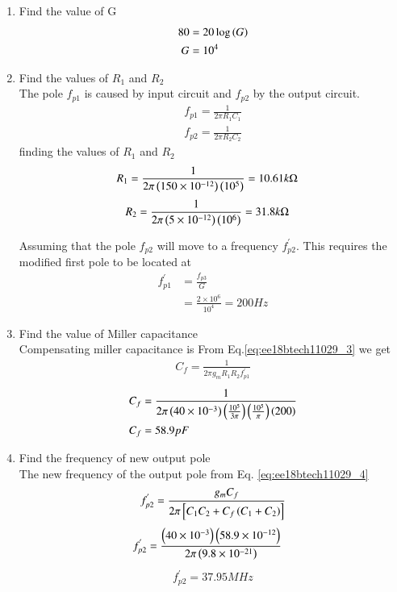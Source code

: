 \begin{enumerate}[label=\thesubsection.\arabic*.,ref=\thesubsection.\theenumi]
\item Find the value of G
\begin{align}
    80&=20\log\left(G\right)\\
    G&=10^{4}
\end{align}
\item Find the values of $R_{1}$ and $R_{2}$\\
\solution The pole $f_{p1}$ is caused by input circuit and $f_{p2}$ by the output circuit.
\begin{align}
    f_{p1} = \frac{1}{2\pi R_{1}C_{1}}\\
    f_{p2} = \frac{1}{2\pi R_{2}C_{2}}
\end{align}
finding the values of $R_{1}$ and $R_{2}$
\begin{align}
     R_{1} &= \frac{1}{2\pi\left(150\times10^{-12}\right)\left(10^{5}\right)} = 10.61k\Omega
\end{align}
\begin{align}
     R_{2} &= \frac{1}{2\pi\left(5\times10^{-12}\right)\left(10^{6}\right)} = 31.8k\Omega
\end{align}

Assuming that the pole $f_{p2}$ will move to a frequency $f_{p2}^{'}$. This requires the modified first pole to be located at 
\begin{align}
    f_{p1}^{'} &= \frac{f_{p3}}{G}\\
    &= \frac{2\times10^{6}}{10^{4}} = 200 Hz
\end{align}


\begin{table}[!t]
\centering

\caption{}
\label{table: Input_Table}
\end{table}
\item Find the value of Miller capacitance\\
\solution Compensating miller capacitance is 
From Eq.\eqref{eq:ee18btech11029_3} we get
\begin{align}
    C_{f}=\frac{1}{2\pi g_{m}R_{1}R_{2}f_{p1}^{'}}
\end{align}
\begin{align}
    C_{f}&= \frac{1}{2\pi\left(40\times10^{-3}\right)\left(\frac{10^{5}}{3\pi}\right)\left(\frac{10^{5}}{\pi}\right)\left(200\right)}\\
    C_{f}&=58.9pF
\end{align}
\item Find the frequency of new output pole\\
\solution
The new frequency of the output pole from Eq. \eqref{eq:ee18btech11029_4}
\begin{align}
    f_{p2}^{'} = \frac{g_{m}C_{f}}{2\pi{}\left[C_{1}C_{2} + C_{f}\left({C_{1}+C_{2}}\right)\right]}
\end{align}
\begin{align}
    f_{p2}^{'} &= \frac{\left(40\times10^{-3}\right)\left(58.9\times10^{-12}\right)}{2\pi\left(9.8\times10^{-21}\right)}
\end{align}
\begin{align}
    f_{p2}^{'}=37.95MHz
\end{align}


\end{enumerate}
